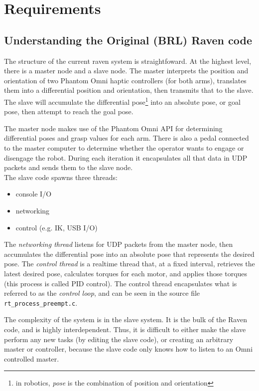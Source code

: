 \documentclass[letterpaper,twocolumn,10pt]{article}
\begin{document}
\section{Requirements}

\subsection{Understanding the Original (BRL) Raven code}

The structure of the current raven system is straightfoward. At the
highest level, there is a master node and a slave node. The master
interprets the position and orientation of two Phantom Omni haptic
controllers (for both arms), translates them into a differential
position and orientation, then transmits that to the slave. The slave
will accumulate the differential pose\footnote{in robotics, \emph{pose}
  is the combination of position and orientation} into an absolute
pose, or goal pose, then attempt to reach the goal pose.

The master node makes use of the Phantom Omni API for determining
differential poses and grasp values for each arm. There is also a
pedal connected to the master computer to determine whether the
operator wants to engage or disengage the robot. During each iteration
it encapsulates all that data in UDP packets and sends them to the
slave node. \\

\noindent
The slave code spawns three threads:

\begin{itemize}
  \item console I/O
  \item networking
  \item control (e.g. IK, USB I/O)
\end{itemize}

The \emph{networking thread} listens for UDP packets from the master
node, then accumulates the differential pose into an absolute pose
that represents the desired pose. The \emph{control thread} is a
realtime thread that, at a fixed interval, retrieves the latest
desired pose, calculates torques for each motor, and applies those
torques (this process is called PID control). The control thread
encapsulates what is referred to as the \emph{control loop}, and can
be seen in the source file \texttt{rt\_process\_preempt.c}.

The complexity of the system is in the slave system. It is the bulk 
of the Raven code, and is highly interdependent. Thus, it is difficult 
to either make the slave perform any new tasks (by editing the slave 
code), or creating an arbitrary master or controller, because the 
slave code only knows how to listen to an Omni controlled master.
\end{document}
